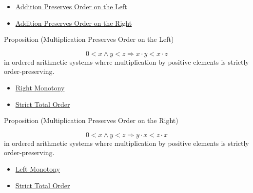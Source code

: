 \begin{dependencies}
\begin{itemize}
  \item \hyperref[prop:addition-order-compatibility-left]{Addition Preserves Order on the Left}
  \item \hyperref[prop:addition-order-compatibility-right]{Addition Preserves Order on the Right}
\end{itemize}
\end{dependencies}

\begin{propositionbox}{Proposition (Multiplication Preserves Order on the Left)}
\begin{proposition}
\label{prop:multiplication-order-compatibility-left}
\[
0<x \land y<z \Longrightarrow x\cdot y<x\cdot z
\]
in ordered arithmetic systems where multiplication by positive elements is
strictly order-preserving.
\end{proposition}
\end{propositionbox}

\begin{dependencies}
\begin{itemize}
  \item \hyperref[def:right-monotony]{Right Monotony}
  \item \hyperref[def:strict-total-order]{Strict Total Order}
\end{itemize}
\end{dependencies}

\begin{propositionbox}{Proposition (Multiplication Preserves Order on the Right)}
\begin{proposition}
\label{prop:multiplication-order-compatibility-right}
\[
0<x \land y<z \Longrightarrow y\cdot x<z\cdot x
\]
in ordered arithmetic systems where multiplication by positive elements is
strictly order-preserving.
\end{proposition}
\end{propositionbox}

\begin{dependencies}
\begin{itemize}
  \item \hyperref[def:left-monotony]{Left Monotony}
  \item \hyperref[def:strict-total-order]{Strict Total Order}
\end{itemize}
\end{dependencies}

